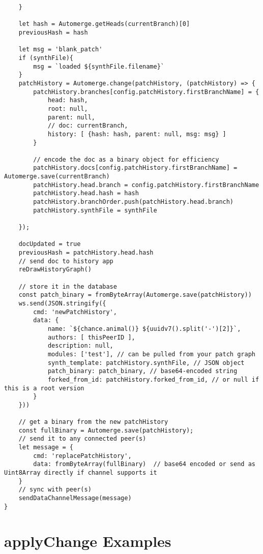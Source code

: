 \begin{lstlisting}
    }

    let hash = Automerge.getHeads(currentBranch)[0]
    previousHash = hash

    let msg = 'blank_patch'
    if (synthFile){
        msg = `loaded ${synthFile.filename}`
    }
    patchHistory = Automerge.change(patchHistory, (patchHistory) => {
        patchHistory.branches[config.patchHistory.firstBranchName] = {
            head: hash,
            root: null,
            parent: null,
            // doc: currentBranch,
            history: [ {hash: hash, parent: null, msg: msg} ] 
        }
        
        // encode the doc as a binary object for efficiency
        patchHistory.docs[config.patchHistory.firstBranchName] = Automerge.save(currentBranch)
        patchHistory.head.branch = config.patchHistory.firstBranchName
        patchHistory.head.hash = hash 
        patchHistory.branchOrder.push(patchHistory.head.branch)
        patchHistory.synthFile = synthFile
        
    });     
        
    docUpdated = true
    previousHash = patchHistory.head.hash
    // send doc to history app
    reDrawHistoryGraph()

    // store it in the database
    const patch_binary = fromByteArray(Automerge.save(patchHistory))
    ws.send(JSON.stringify({
        cmd: 'newPatchHistory',
        data: {
            name: `${chance.animal()} ${uuidv7().split('-')[2]}`,
            authors: [ thisPeerID ],
            description: null,
            modules: ['test'], // can be pulled from your patch graph
            synth_template: patchHistory.synthFile, // JSON object
            patch_binary: patch_binary, // base64-encoded string
            forked_from_id: patchHistory.forked_from_id, // or null if this is a root version
        }
    }))

    // get a binary from the new patchHistory
    const fullBinary = Automerge.save(patchHistory);
    // send it to any connected peer(s)
    let message = {
        cmd: 'replacePatchHistory',
        data: fromByteArray(fullBinary)  // base64 encoded or send as Uint8Array directly if channel supports it
    }
    // sync with peer(s)
    sendDataChannelMessage(message)
}

\end{lstlisting}

\section{applyChange Examples}

